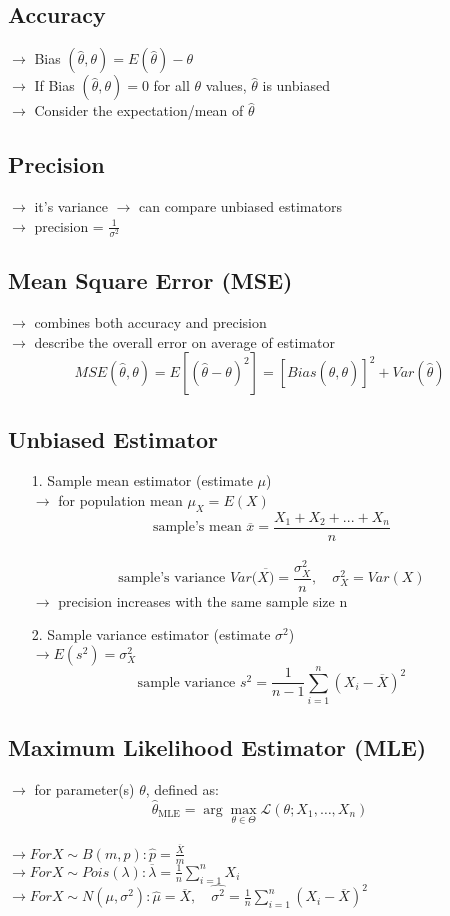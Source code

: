 \documentclass{article}
\begin{document}
\subsection{Accuracy}
$\rightarrow$ Bias $(\hat{\theta},\theta) = E(\hat{\theta})-\theta$\\
$\rightarrow$ If Bias $(\hat{\theta},\theta) = 0$ for all $\theta$ values, $\hat{\theta}$ is unbiased\\
$\rightarrow$ Consider the expectation/mean of $\hat{\theta}$
\subsection{Precision}
$\rightarrow$ it's variance $\rightarrow$ can compare unbiased estimators\\
$\rightarrow$ precision = $\frac{1}{\sigma^2}$
\subsection{Mean Square Error (MSE)}
$\rightarrow$ combines both accuracy and precision\\
$\rightarrow$ describe the overall error on average of estimator\\
\[MSE(\hat{\theta},\theta)=E[(\hat{\theta}-\theta)^2]=[Bias(\hat{\theta},\theta)]^2+Var(\hat{\theta})\]
\subsection{Unbiased Estimator}
\begin{itemize}
    \item [1.] Sample mean estimator (estimate $\mu$)\\
    $\rightarrow$ for population mean $\mu_X = E(X)$\\
    \[\text{sample's mean } \overline{x}=\frac{X_1+X_2+...+X_n}{n}\]\\
    \[\text{sample's variance }Var(\overline{X)}=\frac{\sigma_X^2}{n}, \quad \sigma_X^2=Var(X)\]
    $\rightarrow$ precision increases with the same sample size n\\
    \item[2.] Sample variance estimator (estimate $\sigma^2$)\\
    $\rightarrow E(s^2)=\sigma_X^2$\\
    \[\text{sample variance }s^2=\frac{1}{n-1}\sum_{i=1}^n(X_i - \overline{X})^2 \]
\end{itemize}
\subsection{Maximum Likelihood Estimator (MLE)}
$\rightarrow$ for parameter(s) $\theta$, defined as:\\
\[\hat{\theta}_{\text{MLE}} = \arg \max_{\theta \in \Theta} \mathcal{L}(\theta; X_1, \dots, X_n)\]\\
$\rightarrow For  X \sim B(m,p):\hat{p}=\frac{\overline{X}}{m}$\\
$\rightarrow For  X \sim Pois(\lambda):\overline{\lambda}=\frac{1}{n}\sum_{i=1}^n X_i$\\
$\rightarrow For X \sim N(\mu,\sigma^2):\hat{\mu}=\overline{X}, \quad \hat{\sigma^2}=\frac{1}{n}\sum_{i=1}^n (X_i-\overline{X})^2$
\end{document}
